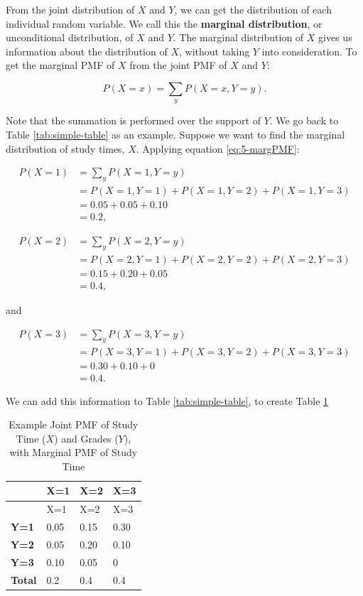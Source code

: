 \documentclass[
]{book}
\begin{document}
From the joint distribution of \(X\) and \(Y\), we can get the distribution of each individual random variable. We call this the \textbf{marginal distribution}, or unconditional distribution, of \(X\) and \(Y\). The marginal distribution of \(X\) gives us information about the distribution of \(X\), without taking \(Y\) into consideration. To get the marginal PMF of \(X\) from the joint PMF of \(X\) and \(Y\):

\begin{equation} 
P(X=x) = \sum_y P(X=x, Y=y).
\label{eq:5-margPMF}
\end{equation}

Note that the summation is performed over the support of \(Y\). We go back to Table \ref{tab:simple-table} as an example. Suppose we want to find the marginal distribution of study times, \(X\). Applying equation \eqref{eq:5-margPMF}:

\[
\begin{split}
P(X=1) &= \sum_y P(X=1, Y=y)\\
 &= P(X=1, Y=1) + P(X=1, Y=2) + P(X=1, Y=3) \\
&= 0.05 + 0.05 + 0.10\\
&= 0.2,
\end{split}
\]

\[
\begin{split}
P(X=2) &= \sum_y P(X=2, Y=y)\\
 &= P(X=2, Y=1) + P(X=2, Y=2) + P(X=2, Y=3) \\
&= 0.15 + 0.20 + 0.05\\
&= 0.4,
\end{split}
\]

and

\[
\begin{split}
P(X=3) &= \sum_y P(X=3, Y=y)\\
 &= P(X=3, Y=1) + P(X=3, Y=2) + P(X=3, Y=3) \\
&= 0.30 + 0.10 + 0\\
&= 0.4.
\end{split}
\]

We can add this information to Table \ref{tab:simple-table}, to create Table \ref{tab:5-marg-table}

\begin{longtable}[]{@{}llll@{}}
\caption{\label{tab:5-marg-table} Example Joint PMF of Study Time (\(X\)) and Grades (\(Y\)), with Marginal PMF of Study Time}\tabularnewline
\toprule\noalign{}
& X=1 & X=2 & X=3 \\
\midrule\noalign{}
\endfirsthead
\toprule\noalign{}
& X=1 & X=2 & X=3 \\
\midrule\noalign{}
\endhead
\bottomrule\noalign{}
\endlastfoot
\textbf{Y=1} & 0.05 & 0.15 & 0.30 \\
\textbf{Y=2} & 0.05 & 0.20 & 0.10 \\
\textbf{Y=3} & 0.10 & 0.05 & 0 \\
\textbf{Total} & 0.2 & 0.4 & 0.4 \\
\end{longtable}
\end{document}
